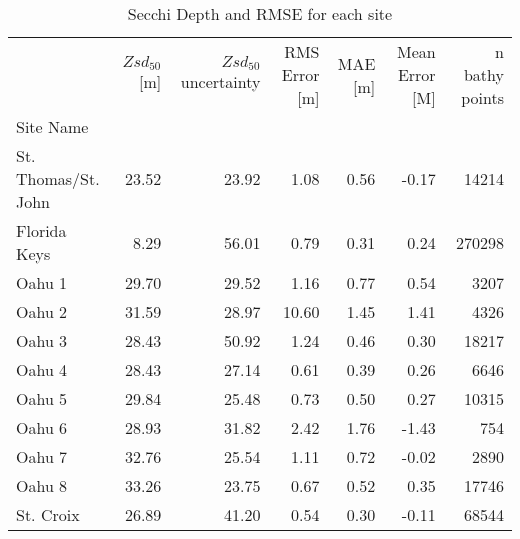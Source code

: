 \begin{table}
\centering
\caption{Secchi Depth and RMSE for each site}
\label{tab:ocean_color_summary_by_site}
\begin{tabular}{lrrrrrr}
\toprule
{} &  $Zsd_{50}$[m] &  $Zsd_{50}$ uncertainty &  RMS Error [m] &  MAE [m] &  Mean Error [M] &  n bathy points \\
Site Name           &                &                         &                &          &                 &                 \\
\midrule
St. Thomas/St. John &          23.52 &                   23.92 &           1.08 &     0.56 &           -0.17 &           14214 \\
Florida Keys        &           8.29 &                   56.01 &           0.79 &     0.31 &            0.24 &          270298 \\
Oahu 1              &          29.70 &                   29.52 &           1.16 &     0.77 &            0.54 &            3207 \\
Oahu 2              &          31.59 &                   28.97 &          10.60 &     1.45 &            1.41 &            4326 \\
Oahu 3              &          28.43 &                   50.92 &           1.24 &     0.46 &            0.30 &           18217 \\
Oahu 4              &          28.43 &                   27.14 &           0.61 &     0.39 &            0.26 &            6646 \\
Oahu 5              &          29.84 &                   25.48 &           0.73 &     0.50 &            0.27 &           10315 \\
Oahu 6              &          28.93 &                   31.82 &           2.42 &     1.76 &           -1.43 &             754 \\
Oahu 7              &          32.76 &                   25.54 &           1.11 &     0.72 &           -0.02 &            2890 \\
Oahu 8              &          33.26 &                   23.75 &           0.67 &     0.52 &            0.35 &           17746 \\
St. Croix           &          26.89 &                   41.20 &           0.54 &     0.30 &           -0.11 &           68544 \\
\bottomrule
\end{tabular}
\end{table}
